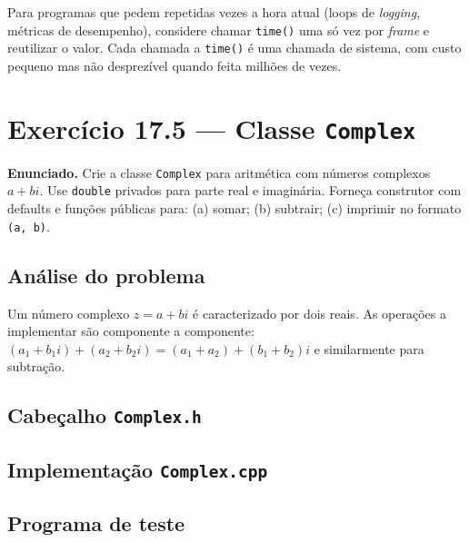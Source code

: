 \documentclass[11pt,a4paper]{article}
\begin{document}
\begin{dicadesemp}
Para programas que pedem repetidas vezes a hora atual (loops de \emph{logging}, m\'etricas de desempenho), considere chamar \texttt{time()} uma s\'o vez por \emph{frame} e reutilizar o valor. Cada chamada a \texttt{time()} \'e uma chamada de sistema, com custo pequeno mas n\~ao desprez\'ivel quando feita milh\~oes de vezes.
\end{dicadesemp}

\newpage
\section{Exerc\'icio 17.5 --- Classe \texttt{Complex}}

\begin{enunciado}
\textbf{Enunciado.} Crie a classe \texttt{Complex} para aritm\'etica com n\'umeros complexos $a + bi$. Use \texttt{double} privados para parte real e imagin\'aria. Forne\c{c}a construtor com defaults e fun\c{c}\~oes p\'ublicas para: (a) somar; (b) subtrair; (c) imprimir no formato \texttt{(a, b)}.
\end{enunciado}

\subsection*{An\'alise do problema}

Um n\'umero complexo $z = a + bi$ \'e caracterizado por dois reais. As opera\c{c}\~oes a implementar s\~ao componente a componente:
$(a_1 + b_1 i) + (a_2 + b_2 i) = (a_1 + a_2) + (b_1 + b_2) i$
e similarmente para subtra\c{c}\~ao.

\subsection*{Cabe\c{c}alho \texttt{Complex.h}}



\subsection*{Implementa\c{c}\~ao \texttt{Complex.cpp}}



\subsection*{Programa de teste}
\end{document}
